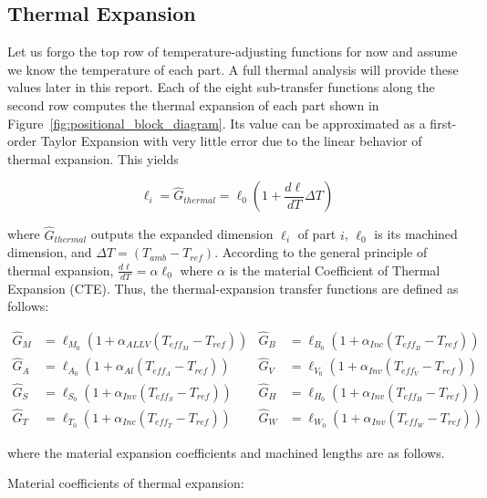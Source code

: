 \documentclass[12pt, letterpaper]{report}%
\newcounter{mycounter}           %
\newcounter{sub}[mycounter]      %
\begin{document}
\begin{appendices}
		\subsection{Thermal Expansion}
		\label{app:sat:TF:G_therm}

			Let us forgo the top row of temperature-adjusting functions for now and assume we know the temperature of each part. A full thermal analysis will provide these values later in this report.
			Each of the eight sub-transfer functions along the second row computes the thermal expansion of each part shown in Figure~\ref{fig:positional_block_diagram}.
			Its value can be approximated as a first-order Taylor Expansion\cite{ref_Jensen, ref_Stewart} with very little error due to the linear behavior of thermal expansion. This yields

				\begin{equation}
					\ell_i = \hat{G}_{thermal} = \ell_0(1 + \frac{d \ell}{dT} \Delta T)
				\end{equation}

			where $\hat{G}_{thermal}$ outputs the expanded dimension $\ell_i$ of part $i$, $\ell_0$ is its machined dimension, and $\Delta T = (T_{amb} - T_{ref})$.
			According to the general principle of thermal expansion\cite[Eq.~4-4]{ref_Hibbeler}, $\frac{d \ell}{dT} = \alpha \ell_0$ where $\alpha$ is the material Coefficient of Thermal Expansion (CTE).
			Thus, the thermal-expansion transfer functions are defined as follows:

			\begin{align}
					\hat{G}_M &= \ell_{M_0} (1 + \alpha_{ALLV} ( T_{{eff}_M} - T_{ref} ) ) &
					\hat{G}_B &= \ell_{B_0} (1 + \alpha_{Inc} ( T_{{eff}_B} - T_{ref} ) ) \label{eq:G_therm_1}\\
					\hat{G}_A &= \ell_{A_0} (1 + \alpha_{Al} ( T_{{eff}_A} - T_{ref} ) ) &
					\hat{G}_V &= \ell_{V_0} (1 + \alpha_{Inv} ( T_{{eff}_V} - T_{ref} ) ) \\
					\hat{G}_S &= \ell_{S_0} (1 + \alpha_{Inv} ( T_{{eff}_S} - T_{ref} ) ) &
					\hat{G}_H &= \ell_{H_0} (1 + \alpha_{Inv} ( T_{{eff}_H} - T_{ref} ) ) \\
					\hat{G}_T &= \ell_{T_0} (1 + \alpha_{Inc} ( T_{{eff}_T} - T_{ref} ) ) &
					\hat{G}_W &= \ell_{W_0} (1 + \alpha_{Inv} ( T_{{eff}_W} - T_{ref} ) ) \label{eq:G_therm_last}
			\end{align}

			where the material expansion coefficients and machined lengths are as follows.

			Material coefficients of thermal expansion:


\end{appendices}
\end{document}
